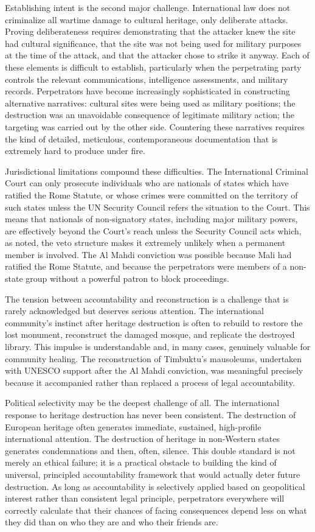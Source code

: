 Establishing intent is the second major challenge. International law does not criminalize all wartime damage to cultural heritage, only deliberate attacks. Proving deliberateness requires demonstrating that the attacker knew the site had cultural significance, that the site was not being used for military purposes at the time of the attack, and that the attacker chose to strike it anyway. Each of these elements is difficult to establish, particularly when the perpetrating party controls the relevant communications, intelligence assessments, and military records. Perpetrators have become increasingly sophisticated in constructing alternative narratives: cultural sites were being used as military positions; the destruction was an unavoidable consequence of legitimate military action; the targeting was carried out by the other side. Countering these narratives requires the kind of detailed, meticulous, contemporaneous documentation that is extremely hard to produce under fire.

Jurisdictional limitations compound these difficulties. The International Criminal Court can only prosecute individuals who are nationals of states which have ratified the Rome Statute, or whose crimes were committed on the territory of such states  unless the UN Security Council refers the situation to the Court. This means that nationals of non-signatory states, including major military powers, are effectively beyond the Court's reach unless the Security Council acts  which, as noted, the veto structure makes it extremely unlikely when a permanent member is involved. The Al Mahdi conviction was possible because Mali had ratified the Rome Statute, and because the perpetrators were members of a non-state group without a powerful patron to block proceedings.

The tension between accountability and reconstruction is a challenge that is rarely acknowledged but deserves serious attention. The international community's instinct after heritage destruction is often to rebuild  to restore the lost monument, reconstruct the damaged mosque, and replicate the destroyed library. This impulse is understandable and, in many cases, genuinely valuable for community healing. The reconstruction of Timbuktu's mausoleums, undertaken with UNESCO support after the Al Mahdi conviction, was meaningful precisely because it accompanied rather than replaced a process of legal accountability.

Political selectivity may be the deepest challenge of all. The international response to heritage destruction has never been consistent. The destruction of European heritage often generates immediate, sustained, high-profile international attention. The destruction of heritage in non-Western states generates condemnations and then, often, silence. This double standard is not merely an ethical failure; it is a practical obstacle to building the kind of universal, principled accountability framework that would actually deter future destruction. As long as accountability is selectively applied based on geopolitical interest rather than consistent legal principle, perpetrators everywhere will correctly calculate that their chances of facing consequences depend less on what they did than on who they are and who their friends are.

